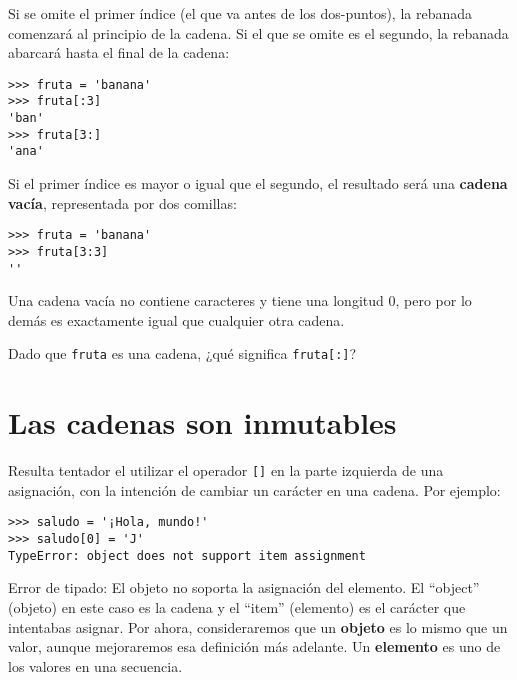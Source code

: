 Si se omite el primer índice (el que va antes de los dos-puntos), la rebanada comenzará
al principio de la cadena. Si el que se omite es el segundo, la rebanada
abarcará hasta el final de la cadena: 

\beforeverb
\begin{verbatim}
>>> fruta = 'banana'
>>> fruta[:3]
'ban'
>>> fruta[3:]
'ana'
\end{verbatim}
\afterverb
%
Si el primer índice es mayor o igual que el segundo, el resultado será
una {\bf cadena vacía}, representada por dos comillas:


\beforeverb
\begin{verbatim}
>>> fruta = 'banana'
>>> fruta[3:3]
''
\end{verbatim}
\afterverb
%
Una cadena vacía no contiene caracteres y tiene una longitud 0, pero por
lo demás es exactamente igual que cualquier otra cadena.

\begin{ex}
Dado que {\tt fruta} es una cadena, ¿qué significa
{\tt fruta[:]}?



\end{ex}


\section{Las cadenas son inmutables}

Resulta tentador el utilizar el operador {\tt []} en la parte izquierda de una
asignación, con la intención de cambiar un carácter en una cadena.
Por ejemplo:


\beforeverb
\begin{verbatim}
>>> saludo = '¡Hola, mundo!'
>>> saludo[0] = 'J'
TypeError: object does not support item assignment
\end{verbatim}
\afterverb
%
Error de tipado: El objeto no soporta la asignación del elemento.
El ``object'' (objeto) en este caso es la cadena y el ``item'' (elemento) es
el carácter que intentabas asignar. Por ahora, consideraremos que un {\bf objeto} es
lo mismo que un valor, aunque mejoraremos esa definición más adelante.
Un {\bf elemento} es uno de los valores en una secuencia.


